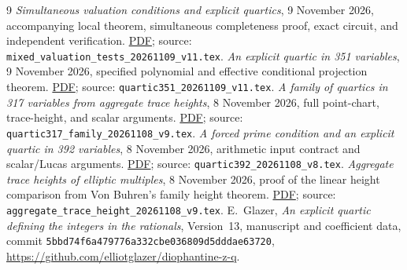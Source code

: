 \documentclass[11pt,a4paper]{article}
\theoremstyle{remark}\newtheorem{remark}[theorem]{Remark}
\begin{document}
\begin{thebibliography}{9}
\emph{Simultaneous valuation conditions and explicit quartics},
9 November 2026, accompanying local theorem, simultaneous completeness
proof, exact circuit, and independent verification.
\href{../local_tests/mixed_valuation_tests_20261109_v11.pdf}{PDF}; source: \nolinkurl{mixed_valuation_tests_20261109_v11.tex}.
\emph{An explicit quartic in 351 variables}, 9 November 2026,
specified polynomial and effective conditional projection theorem.
\href{../quartic/quartic351_20261109_v11.pdf}{PDF}; source: \nolinkurl{quartic351_20261109_v11.tex}.
\emph{A family of quartics in 317 variables from aggregate trace heights},
8 November 2026, full point-chart, trace-height, and scalar arguments.
\href{quartic317_family_20261108_v9.pdf}{PDF}; source: \nolinkurl{quartic317_family_20261108_v9.tex}.
\emph{A forced prime condition and an explicit quartic in 392 variables},
8 November 2026, arithmetic input contract and scalar/Lucas arguments.
\href{../quartic/quartic392_20261108_v8.pdf}{PDF}; source: \nolinkurl{quartic392_20261108_v8.tex}.
\emph{Aggregate trace heights of elliptic multiples},
8 November 2026, proof of the linear height comparison from Von Buhren's
family height theorem.
\href{../trace_heights/aggregate_trace_height_20261108_v9.pdf}{PDF}; source: \nolinkurl{aggregate_trace_height_20261108_v9.tex}.
E.~Glazer, \emph{An explicit quartic defining the integers in the rationals},
Version~13, manuscript and coefficient data, commit
\nolinkurl{5bbd74f6a479776a332cbe036809d5dddae63720},
\url{https://github.com/elliotglazer/diophantine-z-q}.
\end{thebibliography}
\end{document}
